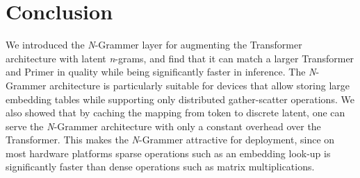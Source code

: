 \documentclass[11pt]{article}
\begin{document}
\section{Conclusion}
We introduced the \textit{N}-Grammer layer for augmenting 
the Transformer architecture with latent \textit{n}-grams, 
and find that it can match a larger Transformer and Primer
in quality while being significantly faster in 
inference. The \textit{N}-Grammer architecture is particularly
suitable for devices that allow storing large embedding tables
while supporting only distributed gather-scatter operations. 
We also showed that by caching the mapping from token to discrete latent, 
one can serve the \textit{N}-Grammer architecture with only a constant 
overhead over the Transformer. This makes the \textit{N}-Grammer
attractive for deployment, since on most hardware platforms
sparse operations such as an embedding look-up is significantly faster
than dense operations such as matrix multiplications.

\clearpage


\end{document}
